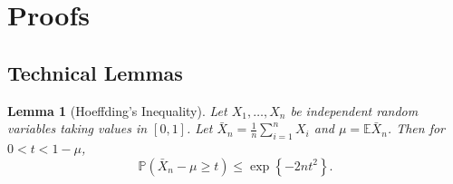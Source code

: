 \documentclass[11pt]{article}
\newtheorem{lemma}{Lemma}
\begin{document}
\section{Proofs}
\subsection{Technical Lemmas}
\begin{lemma}[Hoeffding's Inequality]
	\label{lemma:Hoeffding}
	Let $ X_1, \ldots, X_n $ be independent random variables taking values in $ [0,1] $. Let $ \bar{X}_n=\frac{1}{n}\sum_{i=1}^n X_i  $ and $ \mu = \mathbb{E}\bar{X}_n $. Then for $ 0<t<1-\mu $,
	\begin{equation*}
	\mathbb{P}\left(\bar{X}_n - \mu \geq t \right) \leq  \exp \left\{-2nt^2\right\}.
		\end{equation*}
		\end{lemma}
		
\end{document}
